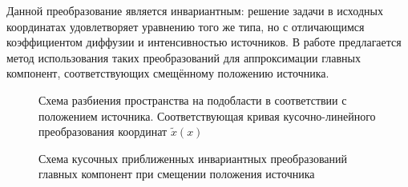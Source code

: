 Данной преобразование является инвариантным: решение задачи в исходных координатах удовлетворяет уравнению того же типа, но с отличающимся коэффициентом диффузии и интенсивностью источников.
В работе предлагается метод использования таких преобразований для аппроксимации главных компонент, соответствующих смещённому положению источника.

\begin{figure}[ht]
    \caption{Схема разбиения пространства на подобласти в соответствии с положением источника. Соответствующая кривая кусочно-линейного преобразования координат $\widetilde{x}(x)$~\cite{Elizarev2022}}\label{fig:domains}
\end{figure}


\begin{figure}[ht]
        \caption{Схема кусочных приближенных инвариантных преобразований главных компонент при смещении положения источника~\cite{Elizarev2022}}\label{fig:dw-scheme}
    \end{figure}

